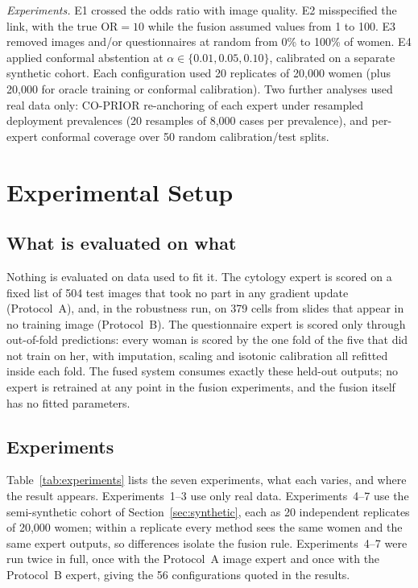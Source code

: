 \documentclass[lettersize,journal]{IEEEtran}
\begin{document}
\emph{Experiments.} E1 crossed the odds ratio with image quality. E2 misspecified the link, with the true $\mathrm{OR}=10$ while the fusion assumed values from 1 to 100. E3 removed images and/or questionnaires at random from 0\% to 100\% of women. E4 applied conformal abstention at $\alpha\in\{0.01,0.05,0.10\}$, calibrated on a separate synthetic cohort. Each configuration used 20 replicates of 20,000 women (plus 20,000 for oracle training or conformal calibration). Two further analyses used real data only: CO-PRIOR re-anchoring of each expert under resampled deployment prevalences (20 resamples of 8,000 cases per prevalence), and per-expert conformal coverage over 50 random calibration/test splits.

\section{Experimental Setup}
\label{sec:setup}

\subsection{What is evaluated on what}
Nothing is evaluated on data used to fit it. The cytology expert is scored on a fixed list of 504 test images that took no part in any gradient update (Protocol~A), and, in the robustness run, on 379 cells from slides that appear in no training image (Protocol~B). The questionnaire expert is scored only through out-of-fold predictions: every woman is scored by the one fold of the five that did not train on her, with imputation, scaling and isotonic calibration all refitted inside each fold. The fused system consumes exactly these held-out outputs; no expert is retrained at any point in the fusion experiments, and the fusion itself has no fitted parameters.

\subsection{Experiments}
Table~\ref{tab:experiments} lists the seven experiments, what each varies, and where the result appears. Experiments~1--3 use only real data. Experiments~4--7 use the semi-synthetic cohort of Section~\ref{sec:synthetic}, each as 20 independent replicates of 20,000 women; within a replicate every method sees the same women and the same expert outputs, so differences isolate the fusion rule. Experiments~4--7 were run twice in full, once with the Protocol~A image expert and once with the Protocol~B expert, giving the 56 configurations quoted in the results.
\end{document}
